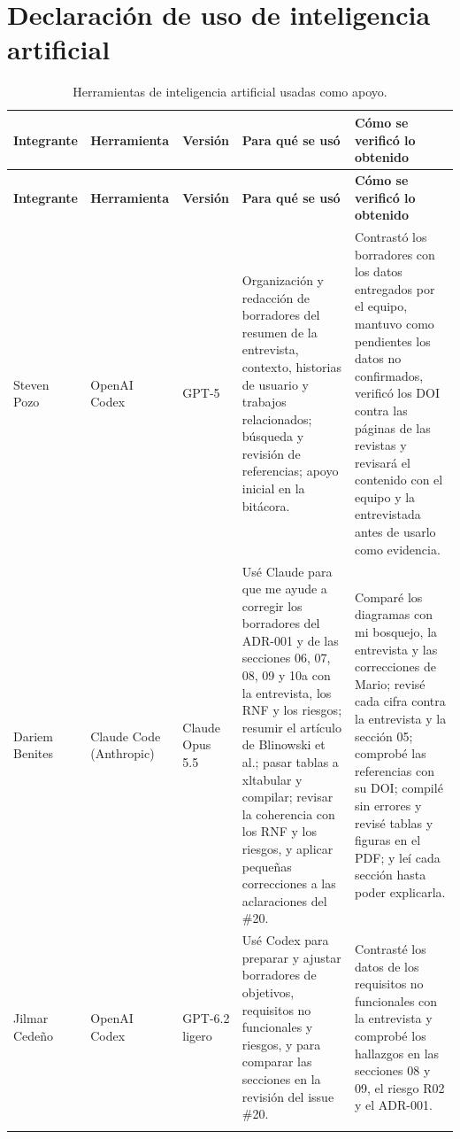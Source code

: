 \section{Declaración de uso de inteligencia artificial}
\label{sec:declaracion-ia}

\begin{xltabular}{\textwidth}{@{} >{\raggedright\arraybackslash}p{2.2cm} >{\raggedright\arraybackslash}p{2.4cm} >{\raggedright\arraybackslash}p{1.7cm} >{\raggedright\arraybackslash}p{3.6cm} >{\raggedright\arraybackslash}p{3.8cm} @{}}
  \caption{Herramientas de inteligencia artificial usadas como apoyo.}
  \label{tab:declaracion-ia} \\
  \toprule
  \textbf{Integrante} & \textbf{Herramienta} & \textbf{Versión} & \textbf{Para qué se usó} & \textbf{Cómo se verificó lo obtenido} \\
  \midrule
  \endfirsthead
  \toprule
  \textbf{Integrante} & \textbf{Herramienta} & \textbf{Versión} & \textbf{Para qué se usó} & \textbf{Cómo se verificó lo obtenido} \\
  \midrule
  \endhead
  \bottomrule
  \endfoot

  Steven Pozo & OpenAI Codex & GPT-5 &
  Organización y redacción de borradores del resumen de la entrevista,
  contexto, historias de usuario y trabajos relacionados; búsqueda y
  revisión de referencias; apoyo inicial en la bitácora. &
  Contrastó los borradores con los datos entregados por el equipo, mantuvo
  como pendientes los datos no confirmados, verificó los DOI contra las
  páginas de las revistas y revisará el contenido con el equipo y la
  entrevistada antes de usarlo como evidencia. \\
  \addlinespace

  Dariem Benites & Claude Code (Anthropic) & Claude Opus 5.5 &
  Usé Claude para que me ayude a corregir los borradores del ADR-001 y
  de las secciones 06, 07, 08, 09 y 10a con la entrevista, los RNF y los
  riesgos; resumir el artículo de Blinowski et al.; pasar tablas a
  xltabular y compilar; revisar la coherencia con los RNF y los riesgos, y
  aplicar pequeñas correcciones a las aclaraciones del \#20. &
  Comparé los diagramas con mi bosquejo, la entrevista y las correcciones
  de Mario; revisé cada cifra contra la entrevista y la sección 05;
  comprobé las referencias con su DOI; compilé sin errores y revisé tablas
  y figuras en el PDF; y leí cada sección hasta poder explicarla. \\
  \addlinespace

  Jilmar Cedeño & OpenAI Codex & GPT-6.2 ligero &
  Usé Codex para preparar y ajustar borradores de objetivos, requisitos no
  funcionales y riesgos, y para comparar las secciones en la revisión del
  issue \#20. &
  Contrasté los datos de los requisitos no funcionales con la entrevista y
  comprobé los hallazgos en las secciones 08 y 09, el riesgo R02 y el
  ADR-001. \\
  \addlinespace


\end{xltabular}
